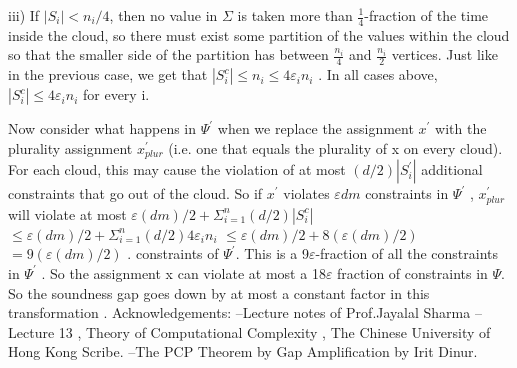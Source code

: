  iii) If $|S_i | < n_i /4$, then no value in $\Sigma$  is taken more than $\frac{1}{4}$-fraction of the time inside the cloud,
so there must exist some partition of the values within the cloud so that the smaller side of
the partition has between $\frac{n_i}{4}$ and  $\frac{n_i}{2}$ vertices. Just like in the previous case, we get that
$|S_{i}^{c} | \leq  n_i \leq  4\varepsilon_i n_i$ .
In all cases above, $|S_{i}^{c} | \leq  4\varepsilon_i n_i$ for every i.

Now consider what happens in $\Psi^{'}$ when we replace the assignment $x^{'}$ with the plurality assignment
$x_{plur}^{'}$ (i.e. one that equals the plurality of x on every cloud). For each cloud, this may cause the
violation of at most $(d/2)|S_{i}^{'}|$ additional constraints that go out of the cloud. So if $x^{'}$ violates $\varepsilon dm$
constraints in $\Psi^{'}$ , $x_{plur}^{'}$ will violate at most
$ \varepsilon (dm)/2 + \Sigma_{i=1}^{n} (d/2)|S_{i}^{c}|$
$ \leq \varepsilon (dm)/2 + \Sigma_{i=1}^{n} (d/2)4\varepsilon_i n_i$
$ \leq \varepsilon (dm)/2 + 8(\varepsilon (dm)/2 )$
$= 9(\varepsilon (dm)/2 )$ .
constraints of $\Psi^{'}$. This is a 9$\varepsilon $-fraction of all the constraints in $\Psi^{'}$ . So the assignment x can violate at most a 18$\varepsilon $ fraction of constraints in $\Psi $.
\newline So the soundness gap goes down by at most a constant factor in this transformation .
Acknowledgements:
\newline--Lecture notes of Prof.Jayalal Sharma
\newline--Lecture 13 , Theory of Computational Complexity , The Chinese University of Hong Kong Scribe.
\newline--The PCP Theorem by Gap Amplification by Irit Dinur.
